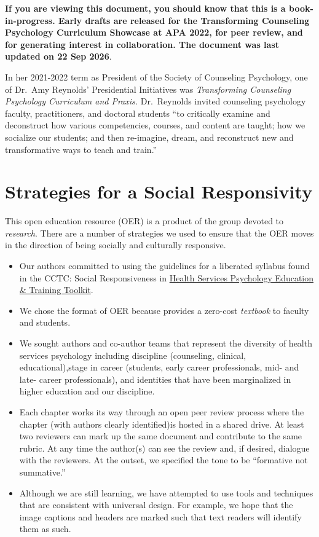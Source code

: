 \documentclass[
  11pt,
]{book}
\providecommand{\tightlist}{%
  \setlength{\itemsep}{0pt}\setlength{\parskip}{0pt}}
\begin{document}
\textbf{If you are viewing this document, you should know that this is a book-in-progress. Early drafts are released for the Transforming Counseling Psychology Curriculum Showcase at APA 2022, for peer review, and for generating interest in collaboration. The document was last updated on 22 Sep 2026}.

In her 2021-2022 term as President of the Society of Counseling Psychology, one of Dr.~Amy Reynolds' Presidential Initiatives was \emph{Transforming Counseling Psychology Curriculum and Praxis.} Dr.~Reynolds invited counseling psychology faculty, practitioners, and doctoral students ``to critically examine and deconstruct how various competencies, courses, and content are taught; how we socialize our students; and then re-imagine, dream, and reconstruct new and transformative ways to teach and train.''

\section*{Strategies for a Social Responsivity}\label{strategies-for-a-social-responsivity}


This open education resource (OER) is a product of the group devoted to \emph{research}. There are a number of strategies we used to ensure that the OER moves in the direction of being socially and culturally responsive.

\begin{itemize}
\tightlist
\item
  Our authors committed to using the guidelines for a liberated syllabus found in the CCTC: Social Responsiveness in \href{https://www.cctcpsychology.org/resources-for-cctc-members-and-liaisons/}{Health Services Psychology Education \& Training Toolkit}.
\item
  We chose the format of OER because provides a zero-cost \emph{textbook} to faculty and students.
\item
  We sought authors and co-author teams that represent the diversity of health services psychology including discipline (counseling, clinical, educational),stage in career (students, early career professionals, mid- and late- career professionals), and identities that have been marginalized in higher education and our discipline.
\item
  Each chapter works its way through an open peer review process where the chapter (with authors clearly identified)is hosted in a shared drive. At least two reviewers can mark up the same document and contribute to the same rubric. At any time the author(s) can see the review and, if desired, dialogue with the reviewers. At the outset, we specified the tone to be ``formative not summative.''
\item
  Although we are still learning, we have attempted to use tools and techniques that are consistent with universal design. For example, we hope that the image captions and headers are marked such that text readers will identify them as such.
\end{itemize}
\end{document}
